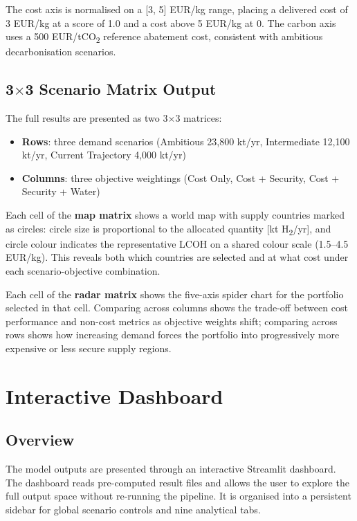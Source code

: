 The cost axis is normalised on a [3, 5] EUR/kg range, placing a delivered cost of 3 EUR/kg at a score of 1.0 and a cost above 5 EUR/kg at 0. The carbon axis uses a 500 EUR/tCO\textsubscript{2} reference abatement cost, consistent with ambitious decarbonisation scenarios.

\subsection{3$\times$3 Scenario Matrix Output}

The full results are presented as two 3$\times$3 matrices:
\begin{itemize}
    \item \textbf{Rows}: three demand scenarios (Ambitious 23{,}800 kt/yr, Intermediate 12{,}100 kt/yr, Current Trajectory 4{,}000 kt/yr)
    \item \textbf{Columns}: three objective weightings (Cost Only, Cost + Security, Cost + Security + Water)
\end{itemize}

Each cell of the \textbf{map matrix} shows a world map with supply countries marked as circles: circle size is proportional to the allocated quantity [kt H\textsubscript{2}/yr], and circle colour indicates the representative LCOH on a shared colour scale (1.5--4.5 EUR/kg). This reveals both which countries are selected and at what cost under each scenario-objective combination.

Each cell of the \textbf{radar matrix} shows the five-axis spider chart for the portfolio selected in that cell. Comparing across columns shows the trade-off between cost performance and non-cost metrics as objective weights shift; comparing across rows shows how increasing demand forces the portfolio into progressively more expensive or less secure supply regions.

\section{Interactive Dashboard}
\label{sec:dashboard}

\subsection{Overview}

The model outputs are presented through an interactive Streamlit dashboard. The dashboard reads pre-computed result files and allows the user to explore the full output space without re-running the pipeline. It is organised into a persistent sidebar for global scenario controls and nine analytical tabs.

